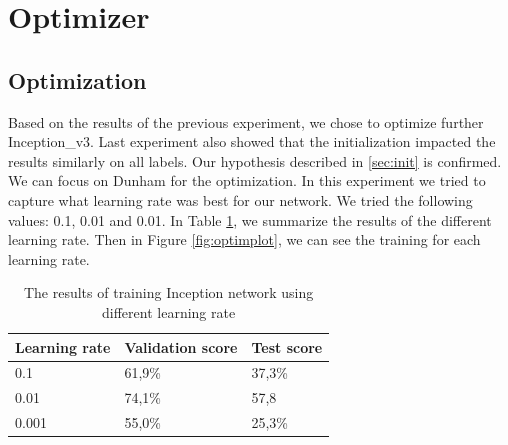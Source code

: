 \section{Optimizer}
\subsection{Optimization}
Based on the results of the previous experiment, we chose to optimize further Inception\_v3. Last experiment also showed that the initialization impacted the results similarly on all labels. Our hypothesis described in \ref{sec:init} is confirmed. We can focus on Dunham for the optimization.
In this experiment we tried to capture what learning rate was best for our network. We tried the following values: 0.1, 0.01 and 0.01. In Table \ref{tab:optimlr}, we summarize the results of the different learning rate. Then in Figure \ref{fig:optimplot}, we can see the training for each learning rate. 

\begin{table}
\caption{\label{tab:optimlr} The results of training Inception network using different learning rate}
\centering
\begin{tabular}[b]{| l | l | l |}
\hline
    Learning rate & Validation score  & Test score\\ \hline
    0.1  &  61,9\%  & 37,3\% \\ \hline
    0.01 & 74,1\% &  57,8\\ \hline
    0.001 & 55,0\% &  25,3\% \\ \hline
\end{tabular} 
\end{table}

